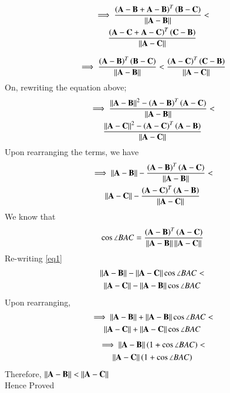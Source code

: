 \documentclass[journal,12pt,twocolumn]{IEEEtran}
\begin{document}
\begin{multline}
\implies\frac{\left( \mathbf{A - B+A-B} \right)^T  \left( \mathbf{B - C } \right)}{\left\lVert\mathbf{ A - B}\right\rVert }<\\\frac{\left( \mathbf{ A - C+A-C} \right)^T  \left( \mathbf{C - B} \right)}{\left\lVert\mathbf{ A - C}\right\rVert}
\end{multline}

\begin{align}
\implies\frac{\left( \mathbf{A - B} \right)^T  \left( \mathbf{B - C } \right)}{\left\lVert\mathbf{ A - B}\right\rVert }<\frac{\left( \mathbf{ A - C} \right)^T  \left( \mathbf{C - B} \right)}{\left\lVert\mathbf{ A - C}\right\rVert}
\end{align}
On, rewriting the equation above;
\begin{multline}
\implies\frac{\left\lVert\mathbf{ A - B}\right\rVert^2 - \left( \mathbf{A - B } \right)^T \left( \mathbf{A - C } \right)}{\left\lVert\mathbf{ A - B}\right\rVert}<\\ \frac{\left\lVert\mathbf{ A - C}\right\rVert^2 - \left( \mathbf{A - C } \right)^T \left( \mathbf{A - B } \right)}{\left\lVert\mathbf{ A - C}\right\rVert}
\end{multline}
Upon rearranging the terms, we have
\begin{multline}
\implies\left\lVert\mathbf{ A - B}\right\rVert-\frac{ \left( \mathbf{A - B } \right)^T \left( \mathbf{A - C } \right)}{\left\lVert\mathbf{ A - B}\right\rVert}<\\ \left\lVert\mathbf{ A - C}\right\rVert-\frac{ \left( \mathbf{A - C } \right)^T \left( \mathbf{A - B } \right)}{\left\lVert\mathbf{ A - C}\right\rVert}\label{eq1}
\end{multline}
We know that 
\begin{align}
\cos\angle BAC= \frac{\left( \mathbf{A - B } \right)^T \left( \mathbf{A - C } \right)}{\left\lVert\mathbf{ A - B}\right\rVert\left\lVert\mathbf{ A - C}\right\rVert}
\end{align}
Re-writing \eqref{eq1}
\begin{multline}
\left\lVert\mathbf{A - B} \right\rVert-\left\lVert\mathbf{A - C} \right\rVert\cos\angle BAC<\\\left\lVert\mathbf{ A - C}\right\rVert-\left\lVert\mathbf{A - B} \right\rVert\cos\angle BAC
\end{multline}  
Upon rearranging,
\begin{multline}
\implies\left\lVert\mathbf{A - B} \right\rVert+\left\lVert\mathbf{A - B} \right\rVert\cos\angle BAC<\\\left\lVert\mathbf{A - C}\right\rVert+\left\lVert\mathbf{A - C} \right\rVert\cos\angle BAC\end{multline}
\begin{multline}
\implies
\left\lVert\mathbf{A - B} \right\rVert(1+\cos\angle BAC)<\\\left\lVert\mathbf{A - C} \right\rVert(1+\cos\angle BAC)\end{multline}
Therefore,
$\left\lVert\mathbf{A - B}\right\rVert < \left\lVert\mathbf{A - C}\right\rVert$\\
Hence Proved
\end{document}
